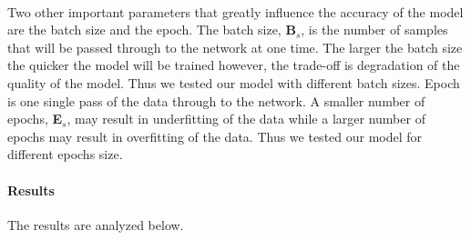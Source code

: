 \paragraph{} Two other important parameters that greatly influence the accuracy of the model are the batch size and the epoch. The batch size, \textbf{B$_{s}$}, is the number of samples that will be passed through to the network at one time. The larger the batch size the quicker the model will be trained however, the trade-off is degradation of the quality of the model. Thus we tested our model with different batch sizes. Epoch is one single pass of the data through to the network. A smaller number of epochs, \textbf{E$_{s}$}, may result in underfitting of the data while a larger number of epochs may result in overfitting of the data. Thus we tested our model for different epochs size.

\paragraph{Results} The results are analyzed below.
\begin{center}
\label{tab:lstm_analysis}
\end{center}

